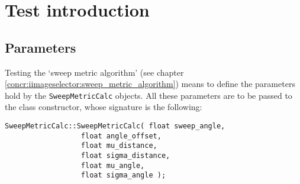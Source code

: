 \section{Test introduction}
\label{performance_evaluation:testintro}


\subsection{Parameters}
\label{performance_evaluation:testintro:parameters}

Testing the `sweep metric algorithm' (see chapter
\ref{concr:iimageselector:sweep_metric_algorithm}) means to define
the parameters hold by the \texttt{SweepMetricCalc}
objects. All these parameters are 
to be passed to the class constructor, whose signature
is the following:
\\
\begin{lstlisting}[caption={\texttt{SweepMetricCalc} class declaration},
    label={code:sweepmetriccalc}]
SweepMetricCalc::SweepMetricCalc( float sweep_angle,
				  float angle_offset,
				  float mu_distance,
				  float sigma_distance,
				  float mu_angle,
				  float sigma_angle );				  
\end{lstlisting}


